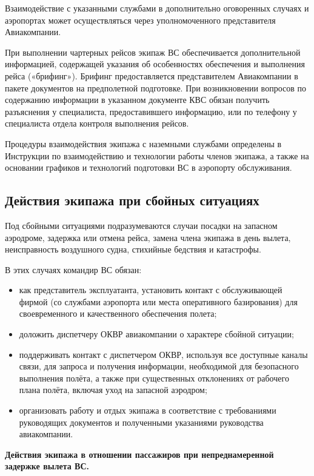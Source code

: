 Взаимодействие с указанными службами в дополнительно оговоренных случаях и аэропортах может осуществляться через уполномоченного представителя Авиакомпании.

При выполнении чартерных рейсов экипаж ВС обеспечивается дополнительной информацией, содержащей указания об особенностях обеспечения и выполнения рейса («брифинг»). Брифинг предоставляется представителем Авиакомпании в пакете документов на предполетной подготовке. При возникновении вопросов по содержанию информации в указанном документе КВС обязан получить разъяснения у специалиста, предоставившего информацию, или по телефону у специалиста отдела контроля выполнения рейсов.

Процедуры взаимодействия экипажа с наземными службами определены в Инструкции по взаимодействию и технологии работы членов экипажа, а также на основании графиков и технологий подготовки ВС в аэропорту обслуживания.

\subsection{Действия экипажа при сбойных ситуациях}

Под сбойными ситуациями подразумеваются случаи посадки на запасном аэродроме, задержка или отмена рейса, замена члена экипажа в день вылета, неисправность воздушного судна, стихийные бедствия и катастрофы.

В этих случаях командир ВС обязан:
\begin{itemize}
    \item как представитель эксплуатанта, установить контакт с обслуживающей фирмой (со службами аэропорта или места оперативного базирования) для своевременного и качественного обеспечения полета;
    \item доложить диспетчеру ОКВР авиакомпании о характере сбойной ситуации;
    \item поддерживать контакт с диспетчером ОКВР, используя все доступные каналы связи, для запроса и получения информации, необходимой для безопасного выполнения полёта, а также при существенных отклонениях от рабочего плана полёта, включая уход на запасной аэродром;
    \item организовать работу и отдых экипажа в соответствие с требованиями руководящих документов и полученными указаниями руководства авиакомпании.
\end{itemize}

\textbf{Действия экипажа в отношении пассажиров при непреднамеренной задержке вылета ВС.}

